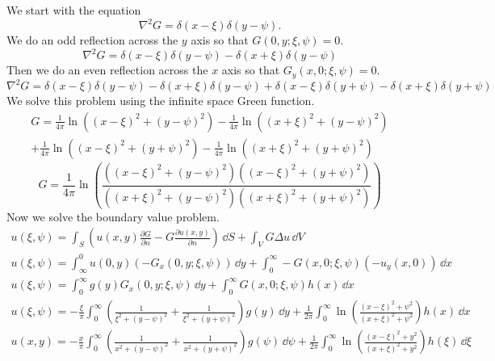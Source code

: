 {\begin{Solution}
\begin{enumerate}
  \end{enumerate}
\end{Solution}






\begin{Solution}
  We start with the equation
  \[
  \nabla^2 G = \delta(x - \xi) \delta(y - \psi).
  \]
  We do an odd reflection across the $y$ axis so that 
  $G(0,y; \xi,\psi) = 0$.
  \[
  \nabla^2 G = \delta(x - \xi) \delta(y - \psi)
  - \delta(x + \xi) \delta(y - \psi)
  \]
  Then we do an even reflection across the $x$ axis so that
  $G_y(x,0; \xi,\psi) = 0$.
  \[
  \nabla^2 G = \delta(x - \xi) \delta(y - \psi)
  - \delta(x + \xi) \delta(y - \psi)
  + \delta(x - \xi) \delta(y + \psi)
  - \delta(x + \xi) \delta(y + \psi)
  \]
  We solve this problem using the infinite space Green function.
  \begin{multline*}
    G = \frac{1}{4 \pi} \ln \left( (x-\xi)^2 + (y-\psi)^2 \right)
    - \frac{1}{4 \pi} \ln \left( (x+\xi)^2 + (y-\psi)^2 \right) 
    \\
    + \frac{1}{4 \pi} \ln \left( (x-\xi)^2 + (y+\psi)^2 \right)
    - \frac{1}{4 \pi} \ln \left( (x+\xi)^2 + (y+\psi)^2 \right) 
  \end{multline*}
  \[
  G = \frac{1}{4 \pi} \ln \left( 
    \frac{ \left( (x-\xi)^2 + (y-\psi)^2 \right)
      \left( (x-\xi)^2 + (y+\psi)^2 \right) }
    { \left( (x+\xi)^2 + (y-\psi)^2 \right) 
      \left( (x+\xi)^2 + (y+\psi)^2 \right) } \right)
  \]
  Now we solve the boundary value problem.
  \begin{gather*}
    u(\xi,\psi) = \int_S \left( u(x,y) \frac{\partial G}{\partial n} 
      - G \frac{\partial u(x,y)}{\partial n} \right) \,\dd S
    + \int_V G \Delta u \,\dd V \\
    u(\xi,\psi) = \int_\infty^0 u(0,y) (-G_x(0,y;\xi,\psi)) \,\dd y
    + \int_0^\infty -G(x,0;\xi,\psi) (-u_y(x,0)) \,\dd x \\
    u(\xi,\psi) = \int_0^\infty g(y) G_x(0,y;\xi,\psi) \,\dd y
    + \int_0^\infty G(x,0;\xi,\psi) h(x) \,\dd x \\
    u(\xi,\psi) = - \frac{\xi}{\pi} \int_0^\infty \left(
      \frac{1}{\xi^2 + (y-\psi)^2} + \frac{1}{\xi^2 + (y+\psi)^2}
    \right) g(y) \,\dd y
    + \frac{1}{2 \pi} \int_0^\infty \ln \left( 
      \frac{ (x-\xi)^2 + \psi^2 }{ (x+\xi)^2 + \psi^2 }
    \right) h(x) \,\dd x \\
    u(x,y) = - \frac{x}{\pi} \int_0^\infty \left(
      \frac{1}{x^2 + (y-\psi)^2} + \frac{1}{x^2 + (y+\psi)^2}
    \right) g(\psi) \,\dd \psi
    + \frac{1}{2 \pi} \int_0^\infty \ln \left( 
      \frac{ (x-\xi)^2 + y^2 }{ (x+\xi)^2 + y^2 }
    \right) h(\xi) \,\dd \xi 
  \end{gather*}
\end{Solution}







}
